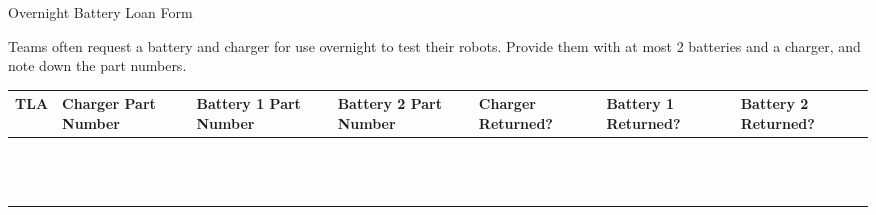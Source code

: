 \documentclass[a4paper, 12pt, landscape]{article}
\begin{document}
\begin{center}

    {\huge{Overnight Battery Loan Form}}

\end{center}

Teams often request a battery and charger for use overnight to test their robots. Provide them with at most 2 batteries and a charger, and note down the part numbers.

\begin{center}
\begin{table}[h]
\large
\def\arraystretch{1.5}
\begin{tabularx}{\textwidth}{|Y|Y|Y|Y|Y|Y|Y|}
    \textbf{TLA} & \textbf{Charger Part Number} & \textbf{Battery 1 Part Number} & \textbf {Battery 2 Part Number} & \textbf{Charger Returned?} & \textbf{Battery 1 Returned?} & \textbf{Battery 2 Returned?} \\
\hline
& & & & & & \\ \hline
& & & & & & \\ \hline
& & & & & & \\ \hline
& & & & & & \\ \hline
& & & & & & \\ \hline
& & & & & & \\ \hline
& & & & & & \\ \hline
& & & & & & \\ \hline
& & & & & & \\ \hline
& & & & & & \\ \hline
& & & & & & \\ \hline
& & & & & & \\ \hline
& & & & & & \\ \hline
\end{tabularx}
\end{table}
\end{center}
\end{document}
